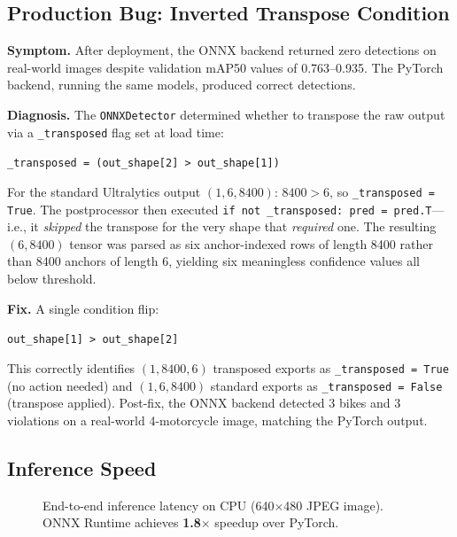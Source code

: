 \documentclass[10pt,twocolumn]{article}
\begin{document}
\subsection{Production Bug: Inverted Transpose Condition}

\textbf{Symptom.} After deployment, the ONNX backend returned zero detections
on real-world images despite validation mAP50 values of 0.763--0.935.
The PyTorch backend, running the same models, produced correct detections.

\textbf{Diagnosis.} The \texttt{ONNXDetector} determined whether to transpose
the raw output via a \texttt{\_transposed} flag set at load time:
\begin{center}
\small\texttt{\_transposed = (out\_shape[2] > out\_shape[1])}
\end{center}
For the standard Ultralytics output $(1, 6, 8400)$:
$8400 > 6$, so \texttt{\_transposed\,=\,True}.
The postprocessor then executed \texttt{if not \_transposed: pred\,=\,pred.T}---
i.e., it \textit{skipped} the transpose for the very shape that
\textit{required} one. The resulting $(6, 8400)$ tensor was parsed as six
anchor-indexed rows of length 8400 rather than 8400 anchors of length 6,
yielding six meaningless confidence values all below threshold.

\textbf{Fix.} A single condition flip:
\begin{center}
\small\texttt{out\_shape[1] > out\_shape[2]}
\end{center}
This correctly identifies $(1, 8400, 6)$ transposed exports as
\texttt{\_transposed\,=\,True} (no action needed) and $(1, 6, 8400)$
standard exports as \texttt{\_transposed\,=\,False} (transpose
applied). Post-fix, the ONNX backend detected 3 bikes and 3 violations
on a real-world 4-motorcycle image, matching the PyTorch output.

\subsection{Inference Speed}

\begin{figure}[H]
\centering
{}
\caption{End-to-end inference latency on CPU (640$\times$480 JPEG image).
ONNX Runtime achieves \textbf{1.8$\times$} speedup over PyTorch.}
\label{fig:speed}
\end{figure}
\end{document}
